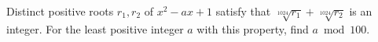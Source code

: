 Distinct positive roots $r_1,r_2$ of $x^2-ax+1$ satisfy that $\sqrt[1024]{r_1}+\sqrt[1024]{r_2}$ is an integer. For the least positive integer $a$ with this property, find $a\bmod100$.
